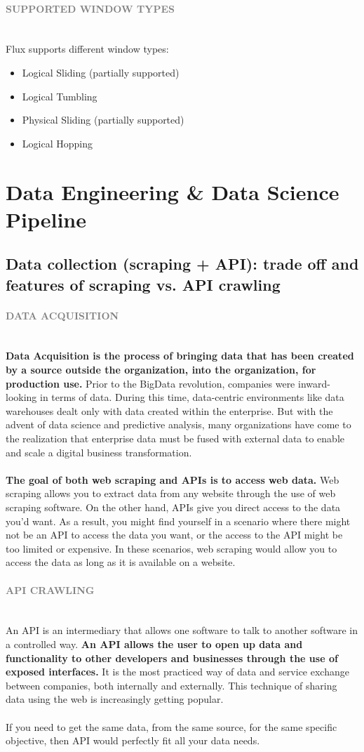 \documentclass[10pt,a4paper]{article}
\newcommand{\nline}{\\~\\}
\newcommand{\myparagraph}[1]{\paragraph{\normalsize{\textcolor{gray}{\uppercase{\textbf{#1}}}} }\mbox{} \vspace{0.5em}\\}
\begin{document}
\myparagraph{Supported Window Types}
Flux supports different window types:
\begin{itemize}
	\item Logical Sliding (partially supported)
	\item Logical Tumbling
	\item Physical Sliding (partially supported)
	\item Logical Hopping
\end{itemize}
\section{Data Engineering \& Data Science Pipeline}
\subsection{Data collection (scraping + API): trade off and features of scraping vs. API crawling}
\myparagraph{Data Acquisition}
\textbf{Data Acquisition is the process of bringing data that has been created by a source outside the organization, into the organization, for production use. }Prior to the BigData revolution, companies were inward-looking in terms of data. During this time, data-centric environments like data warehouses dealt only with data created within the enterprise. But with the advent of data science and predictive analysis, many organizations have come to the realization that enterprise data must be fused with external data to enable and scale a digital business transformation.
\nline
\textbf{The goal of both web scraping and APIs is to access web data.}
Web scraping allows you to extract data from any website through the use of web scraping software. On the other hand, APIs give you direct access to the data you’d want. As a result, you might find yourself in a scenario where there might not be an API to access the data you want, or the access to the API might be too limited or expensive. In these scenarios, web scraping would allow you to access the data as long as it is available on a website.
\myparagraph{API crawling}
An API is an intermediary that allows one software to talk to another software in a controlled way. \textbf{An API allows the user to open up data and functionality to other developers and businesses through the use of exposed interfaces.} It is the most practiced way of data and service exchange between companies, both internally and externally. This technique of sharing data using the web is increasingly getting popular. 
\nline
If you need to get the same data, from the same source, for the same specific objective, then API would perfectly fit all your data needs. 
\end{document}
